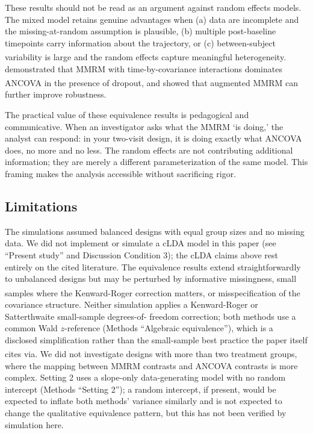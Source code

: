 \documentclass[
  11pt,
]{article}
\begin{document}
These results should not be read as an argument
against random effects models. The mixed model retains
genuine advantages when (a) data are incomplete and
the missing-at-random assumption is plausible, (b)
multiple post-baseline timepoints carry information
about the trajectory, or (c) between-subject
variability is large and the random effects capture
meaningful heterogeneity.\textsuperscript{}
demonstrated that MMRM with time-by-covariance
interactions dominates ANCOVA in the presence of
dropout, and\textsuperscript{} showed that augmented
MMRM can further improve robustness.

The practical value of these equivalence results is
pedagogical and communicative. When an investigator
asks what the MMRM `is doing,' the analyst can
respond: in your two-visit design, it is doing exactly
what ANCOVA does, no more and no less. The random
effects are not contributing additional information;
they are merely a different parameterization of the
same model. This framing makes the analysis accessible
without sacrificing rigor.

\subsection{Limitations}\label{limitations}

The simulations assumed balanced designs with equal
group sizes and no missing data. We did not implement or
simulate a cLDA model in this paper (see ``Present study''
and Discussion Condition 3); the cLDA claims above rest
entirely on the cited literature. The equivalence results
extend straightforwardly to unbalanced designs but may be
perturbed by informative missingness, small samples
where the Kenward-Roger correction\textsuperscript{} matters, or misspecification of
the covariance structure. Neither simulation applies a
Kenward-Roger or Satterthwaite small-sample degrees-of-
freedom correction; both methods use a common Wald
\(z\)-reference (Methods ``Algebraic equivalence''), which is
a disclosed simplification rather than the small-sample
best practice the paper itself cites via\textsuperscript{}. We did not investigate designs with
more than two treatment groups, where the mapping between
MMRM contrasts and ANCOVA contrasts is more complex.
Setting 2 uses a slope-only data-generating model with no
random intercept (Methods ``Setting 2''); a random
intercept, if present, would be expected to inflate both
methods' variance similarly and is not expected to change
the qualitative equivalence pattern, but this has not been
verified by simulation here.
\end{document}
